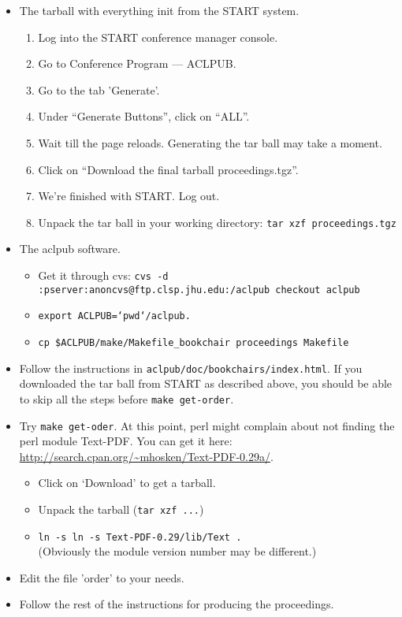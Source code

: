 \documentclass[letterpaper]{article}
\begin{document}
\begin{itemize}
\item The tarball with everything init from the START system.
\begin{enumerate}
\item Log into the START conference manager console.
\item Go to Conference Program --- ACLPUB.
\item Go to the tab 'Generate'.
\item Under ``Generate Buttons'', click on ``ALL''. 
\item Wait till the page reloads. Generating the tar ball may take a moment.
\item Click on ``Download the final tarball proceedings.tgz''.
\item We're finished with START. Log out.
\item Unpack the tar ball in your working directory: 
{\tt tar xzf proceedings.tgz}
\end{enumerate}

\item The aclpub software. 
\begin{itemize}
\item Get it through cvs:
{\tt cvs -d :pserver:anoncvs@ftp.clsp.jhu.edu:/aclpub checkout aclpub}
\item {\tt export ACLPUB=`pwd`/aclpub.}
\item {\tt cp \${ACLPUB}/make/Makefile\_bookchair proceedings Makefile}
\end{itemize}

\item Follow the instructions in {\tt aclpub/doc/bookchairs/index.html}. If you downloaded the tar ball from START as described above, you should be able to skip all the steps before {\tt make get-order}.

\item Try {\tt make get-oder}. At this point, perl might complain about not finding the perl
  module Text-PDF. You can get it here:
  \url{http://search.cpan.org/~mhosken/Text-PDF-0.29a/}.
\begin{itemize}
\item Click on `Download' to get a tarball. 
\item Unpack the tarball ({\tt tar xzf ...}) 
\item {\tt ln -s ln -s Text-PDF-0.29/lib/Text .}\\
(Obviously the module version number may be different.)
\end{itemize}

\item Edit the file 'order' to your needs. 
\item Follow the rest of the instructions for producing the proceedings.
\end{itemize}
\end{document}

